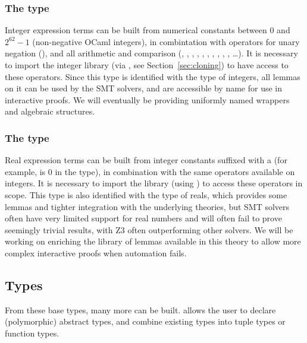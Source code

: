 \subsubsection*{The  type}
Integer expression terms can be built from numerical constants between $0$ and
$2^{62} - 1$ (non-negative OCaml integers), in combintation with operators for
unary negation (\rawec{-}), and all arithmetic and comparison (\rawec{+},
\rawec{-}, \rawec{*}, \rawec{/}, \rawec{\%}, \rawec{^}, \rawec{=}, \rawec{<},
\rawec{<=}, \rawec{>}, \rawec{>=} \ldots). It is necessary to import the integer
library (via , see Section~\ref{sec:cloning}) to have
access to these operators. Since this type is identified with the \WhyThree type
of integers, all \WhyThree lemmas on it can be used by the SMT solvers, and are
accessible by name for use in interactive proofs. We will eventually be
providing uniformly named wrappers and algebraic structures.

\subsubsection*{The  type}
Real expression terms can be built from integer constants suffixed with a
 (for example,  is 0 in the  type), in
combination with the same operators available on integers. It is necessary to
import the library (using ) to access these
operators in scope. This type is also identified with the \WhyThree type of
reals, which provides some lemmas and tighter integration with the underlying
theories, but SMT solvers often have very limited support for real numbers and
will often fail to prove seemingly trivial results, with Z3 often outperforming
other solvers. We will be working on enriching the library of lemmas available
in this theory to allow more complex interactive proofs when automation fails.


\subsection{Types}
From these base types, many more can be built. \EasyCrypt allows the user to declare
 (polymorphic) abstract types, and combine existing types into tuple types or
function types.

